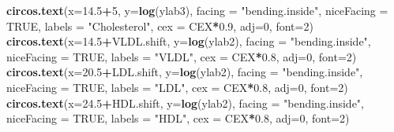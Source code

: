 \documentclass[
]{article}
\newenvironment{Shaded}{\begin{snugshade}}{\end{snugshade}}
\newcommand{\DataTypeTok}[1]{\textcolor[rgb]{0.13,0.29,0.53}{#1}}
\newcommand{\DecValTok}[1]{\textcolor[rgb]{0.00,0.00,0.81}{#1}}
\newcommand{\FloatTok}[1]{\textcolor[rgb]{0.00,0.00,0.81}{#1}}
\newcommand{\KeywordTok}[1]{\textcolor[rgb]{0.13,0.29,0.53}{\textbf{#1}}}
\newcommand{\NormalTok}[1]{#1}
\newcommand{\OperatorTok}[1]{\textcolor[rgb]{0.81,0.36,0.00}{\textbf{#1}}}
\newcommand{\OtherTok}[1]{\textcolor[rgb]{0.56,0.35,0.01}{#1}}
\newcommand{\StringTok}[1]{\textcolor[rgb]{0.31,0.60,0.02}{#1}}
\begin{document}
\begin{Shaded}
\begin{Highlighting}[]
\KeywordTok{circos.text}\NormalTok{(}\DataTypeTok{x=}\FloatTok{14.5}\OperatorTok{+}\DecValTok{5}\NormalTok{, }\DataTypeTok{y=}\KeywordTok{log}\NormalTok{(ylab3), }\DataTypeTok{facing =} \StringTok{"bending.inside"}\NormalTok{, }\DataTypeTok{niceFacing =} \OtherTok{TRUE}\NormalTok{, }\DataTypeTok{labels =} \StringTok{"Cholesterol"}\NormalTok{, }\DataTypeTok{cex =}\NormalTok{ CEX}\OperatorTok{*}\FloatTok{0.9}\NormalTok{, }\DataTypeTok{adj=}\DecValTok{0}\NormalTok{, }\DataTypeTok{font=}\DecValTok{2}\NormalTok{)}
\KeywordTok{circos.text}\NormalTok{(}\DataTypeTok{x=}\FloatTok{14.5}\OperatorTok{+}\NormalTok{VLDL.shift, }\DataTypeTok{y=}\KeywordTok{log}\NormalTok{(ylab2), }\DataTypeTok{facing =} \StringTok{"bending.inside"}\NormalTok{, }\DataTypeTok{niceFacing =} \OtherTok{TRUE}\NormalTok{, }\DataTypeTok{labels =} \StringTok{"VLDL"}\NormalTok{, }\DataTypeTok{cex =}\NormalTok{ CEX}\OperatorTok{*}\FloatTok{0.8}\NormalTok{, }\DataTypeTok{adj=}\DecValTok{0}\NormalTok{, }\DataTypeTok{font=}\DecValTok{2}\NormalTok{)}
\KeywordTok{circos.text}\NormalTok{(}\DataTypeTok{x=}\FloatTok{20.5}\OperatorTok{+}\NormalTok{LDL.shift, }\DataTypeTok{y=}\KeywordTok{log}\NormalTok{(ylab2), }\DataTypeTok{facing =} \StringTok{"bending.inside"}\NormalTok{, }\DataTypeTok{niceFacing =} \OtherTok{TRUE}\NormalTok{, }\DataTypeTok{labels =} \StringTok{"LDL"}\NormalTok{, }\DataTypeTok{cex =}\NormalTok{ CEX}\OperatorTok{*}\FloatTok{0.8}\NormalTok{, }\DataTypeTok{adj=}\DecValTok{0}\NormalTok{, }\DataTypeTok{font=}\DecValTok{2}\NormalTok{)}
\KeywordTok{circos.text}\NormalTok{(}\DataTypeTok{x=}\FloatTok{24.5}\OperatorTok{+}\NormalTok{HDL.shift, }\DataTypeTok{y=}\KeywordTok{log}\NormalTok{(ylab2), }\DataTypeTok{facing =} \StringTok{"bending.inside"}\NormalTok{, }\DataTypeTok{niceFacing =} \OtherTok{TRUE}\NormalTok{, }\DataTypeTok{labels =} \StringTok{"HDL"}\NormalTok{, }\DataTypeTok{cex =}\NormalTok{ CEX}\OperatorTok{*}\FloatTok{0.8}\NormalTok{, }\DataTypeTok{adj=}\DecValTok{0}\NormalTok{, }\DataTypeTok{font=}\DecValTok{2}\NormalTok{) }


\end{Highlighting}
\end{Shaded}
\end{document}
